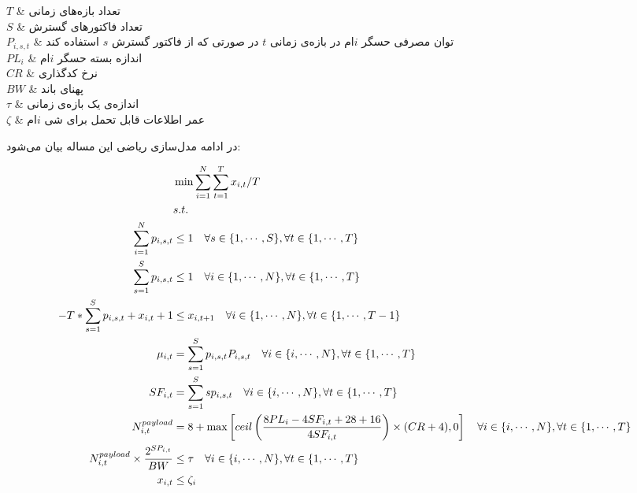 $T$ & تعداد بازه‌های زمانی \\

$S$ & تعداد فاکتورهای گسترش \\

$P_{i, s, t}$ & توان مصرفی حسگر $i$ام در بازه‌ی زمانی $t$ در صورتی که از فاکتور گسترش $s$ استفاده کند \\

$PL_{i}$ & اندازه بسته حسگر $i$ام \\

$CR$ & نرخ کدگذاری \\

$BW$ & پهنای باند \\

$\tau$ & اندازه‌ی یک بازه‌ی زمانی \\

$\zeta$ & عمر اطلاعات قابل تحمل برای شی $i$ام \\



در ادامه مدل‌سازی ریاضی این مساله بیان می‌شود:

\begin{align}
  &\min \sum_{i = 1}^{N} \sum_{t = 1}^{T} x_{i, t} / T \\
  &s.t. \notag \\
  \sum_{i = 1}^{N} p_{i, s, t} &\le 1 \quad \forall s \in \{1, \cdots, S\}, \forall t \in \{1, \cdots, T\} \label{eq:constr_subchannel_limit} \\
  \sum_{s = 1}^{S} p_{i, s, t} &\le 1 \quad \forall i \in \{1, \cdots, N\}, \forall t \in \{1, \cdots, T\} \label{eq:constr_thing_limit} \\
  -T * \sum_{s = 1}^{S} p_{i, s, t} + x_{i, t} + 1 &\le x_{i, t + 1} \quad \forall i \in \{1, \cdots, N\}, \forall t \in \{1, \cdots, T - 1\} \label{eq:constr_aoi_limit} \\
  \mu_{i, t} &= \sum_{s = 1}^{S} p_{i, s, t} P_{i, s, t}  \quad \forall i \in \{i, \cdots, N\}, \forall t \in \{1, \cdots, T\} \label{eq:constr_power_range} \\
  SF_{i, t} &= \sum_{s = 1}^{S} s p_{i, s, t} \quad \forall i \in \{i, \cdots, N\}, \forall t \in \{1, \cdots, T\} \label{eq:constr_set_sp} \\
  N^{payload}_{i, t} &= 8 + \max\left[ ceil \left( \frac{8 PL_{i} - 4 SF_{i,t} + 28 + 16}{4 SF_{i, t}} \right) \times (CR + 4), 0 \right]
                       \quad \forall i \in \{i, \cdots, N\}, \forall t \in \{1, \cdots, T\}
                       \label{eq:constr_payload} \\
  N^{payload}_{i, t} \times \frac{2^{SP_{i, t}}}{BW} &\le \tau \quad \forall i \in \{i, \cdots, N\}, \forall t \in \{1, \cdots, T\}
                                                       \label{eq:constr_time_slot_threshold} \\
  x_{i, t} &\le \zeta_{i} \label{eq:constr_aoi_threshold} \\
\end{align}

